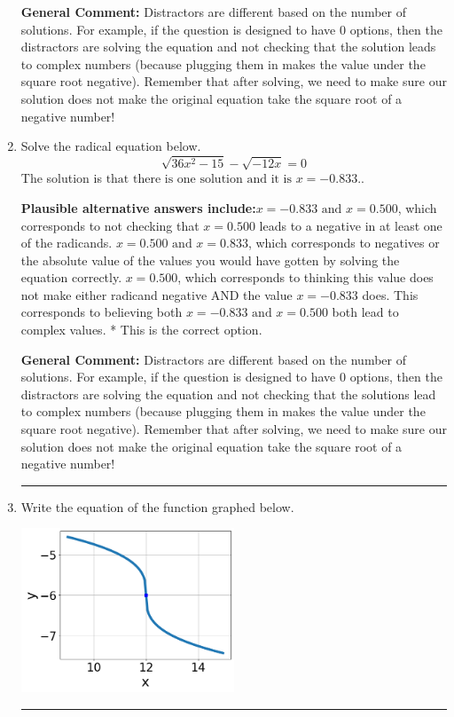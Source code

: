 \documentclass{extbook}[14pt]
\newcommand{\litem}[1]{\item #1

\rule{\textwidth}{0.4pt}}
\begin{document}
\begin{enumerate}
{\textbf{General Comment:} Distractors are different based on the number of solutions. For example, if the question is designed to have 0 options, then the distractors are solving the equation and not checking that the solution leads to complex numbers (because plugging them in makes the value under the square root negative). Remember that after solving, we need to make sure our solution does not make the original equation take the square root of a negative number!
}
\litem{
Solve the radical equation below.
\[ \sqrt{36 x^2 - 15} - \sqrt{-12 x} = 0 \]The solution is \( \text{that there is one solution and it is } x = -0.833. \).\begin{enumerate}[label=\Alph*.]
\textbf{Plausible alternative answers include:}$x = -0.833 \text{ and } x = 0.500$, which corresponds to not checking that $x = 0.500$ leads to a negative in at least one of the radicands.
$x = 0.500 \text{ and } x = 0.833$, which corresponds to negatives or the absolute value of the values you would have gotten by solving the equation correctly.
$x = 0.500$, which corresponds to thinking this value does not make either radicand negative AND the value $x = -0.833$ does.
This corresponds to believing both $x = -0.833 \text{ and } x = 0.500$ both lead to complex values.
* This is the correct option.
\end{enumerate}

\textbf{General Comment:} Distractors are different based on the number of solutions. For example, if the question is designed to have 0 options, then the distractors are solving the equation and not checking that the solutions lead to complex numbers (because plugging them in makes the value under the square root negative). Remember that after solving, we need to make sure our solution does not make the original equation take the square root of a negative number!
}
\litem{
Write the equation of the function graphed below.

\begin{center}
    \includegraphics[width=0.5\textwidth]{../Figures/radicalGraphToEquationCopyC.png}
\end{center}


}
\end{enumerate}
\end{document}
